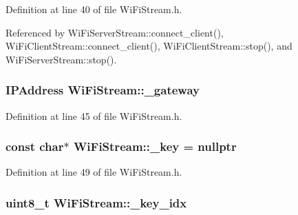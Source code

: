 Definition at line 40 of file Wi\+Fi\+Stream.\+h.



Referenced by Wi\+Fi\+Server\+Stream\+::connect\+\_\+client(), Wi\+Fi\+Client\+Stream\+::connect\+\_\+client(), Wi\+Fi\+Client\+Stream\+::stop(), and Wi\+Fi\+Server\+Stream\+::stop().

\subsubsection[{\texorpdfstring{\+\_\+gateway}{\_gateway}}]{\setlength{\rightskip}{0pt plus 5cm}I\+P\+Address Wi\+Fi\+Stream\+::\+\_\+gateway\hspace{0.3cm}{\ttfamily [protected]}}\hypertarget{class_wi_fi_stream_aee2b9bf291669692faf0c9d52c8dca1d}{}\label{class_wi_fi_stream_aee2b9bf291669692faf0c9d52c8dca1d}


Definition at line 45 of file Wi\+Fi\+Stream.\+h.

\subsubsection[{\texorpdfstring{\+\_\+key}{\_key}}]{\setlength{\rightskip}{0pt plus 5cm}const char$\ast$ Wi\+Fi\+Stream\+::\+\_\+key = nullptr\hspace{0.3cm}{\ttfamily [protected]}}\hypertarget{class_wi_fi_stream_ad8d316924c56442f88a85f714a2a6e95}{}\label{class_wi_fi_stream_ad8d316924c56442f88a85f714a2a6e95}


Definition at line 49 of file Wi\+Fi\+Stream.\+h.

\subsubsection[{\texorpdfstring{\+\_\+key\+\_\+idx}{\_key\_idx}}]{\setlength{\rightskip}{0pt plus 5cm}uint8\+\_\+t Wi\+Fi\+Stream\+::\+\_\+key\+\_\+idx\hspace{0.3cm}{\ttfamily [protected]}}\hypertarget{class_wi_fi_stream_a78fb4d153bfabad324535db5e495d71b}{}\label{class_wi_fi_stream_a78fb4d153bfabad324535db5e495d71b}


